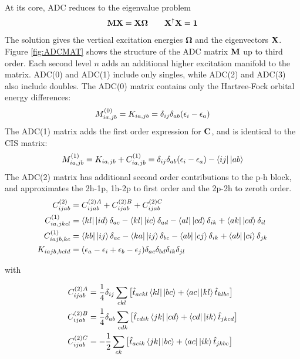 At its core, ADC reduces to the eigenvalue problem
\begin{equation}
\mathbf{M}\mathbf{X} = \mathbf{X}\boldsymbol{\Omega} \qquad \mathbf{X}^{\dagger} \mathbf{X} = \mathbf{1}
\label{eq:ADCEVAL}
\end{equation}
\noindent The solution gives the vertical excitation energies $\boldsymbol{\Omega}$ and the eigenvectors $\mathbf{X}$. Figure \ref{fig:ADCMAT} shows the structure of the ADC matrix $\mathbf{M}$ up to third order. Each second level $n$ adds an additional higher excitation manifold to the matrix. ADC(0) and ADC(1) include only singles, while ADC(2) and ADC(3) also include doubles. The ADC(0) matrix contains only the Hartree-Fock orbital energy differences:
\begin{equation}
M^{(0)}_{ia,jb} = K_{ia,jb} = \delta_{ij}\delta_{ab} (\epsilon_i - \epsilon_a) 
\end{equation}
\noindent The ADC(1) matrix adds the first order expression for $\mathbf{C}$, and is identical to the CIS matrix:
\begin{equation}
M^{(1)}_{ia,jb} = K_{ia,jb} + C_{ia,jb}^{(1)} = \delta_{ij}\delta_{ab} (\eps_i - \eps_a) - \sbra{ij}\sket{ab}
\end{equation} 
\noindent The ADC(2) matrix has additional second order contributions to the p-h block, and approximates the 2h-1p, 1h-2p to first order and the 2p-2h to zeroth order. 
\begin{align}
C_{ijab}^{(2)} &= C_{ijab}^{(2)A} + C_{ijab}^{(2)B} + C_{ijab}^{(2)C} 
\\
C_{ia,jkcl}^{(1)} &= \sbra{kl} \sket{id} \delta_{ac} - \sbra{kl} \sket{ic} \delta_{ad} - \sbra{al} \sket{cd} \delta_{ik} + \sbra{ak} \sket{cd} \delta_{il} 
\\
C_{iajb,kc}^{(1)} &= \sbra{kb} \sket{ij} \delta_{ac} - \sbra{ka} \sket{ij} \delta_{bc} - \bra{ab} \sket{cj} \delta_{ik} + \sbra{ab} \sket{ci} \delta_{jk} 
\\
K_{iajb,kcld} &= (\epsilon_a - \epsilon_i + \epsilon_b - \epsilon_j) \delta_{ac} \delta_{bd} \delta_{ik} \delta_{jl} 
\end{align}

\noindent with

\begin{align}
C_{ijab}^{(2)A} &= \frac{1}{4} \delta_{ij} \sum_{ckl} \left[  \hat{t}_{ackl} \sbra{kl} \sket{bc}  +  \sbra{ac} \sket{kl} \hat{t}_{klbc}\right] \\
C_{ijab}^{(2)B} &= \frac{1}{4} \delta_{ab} \sum_{cdk} \left[ \hat{t}_{cdik} \sbra{jk} \sket{cd} + \sbra{cd} \sket{ik} \hat{t}_{jkcd} \right] \\
C_{ijab}^{(2)C} &= - \frac{1}{2} \sum_{ck} \left[ \hat{t}_{acik}  \sbra{jk} \sket{bc} + \sbra{ac} \sket{ik} \hat{t}_{jkbc} \right] 
\end{align}

